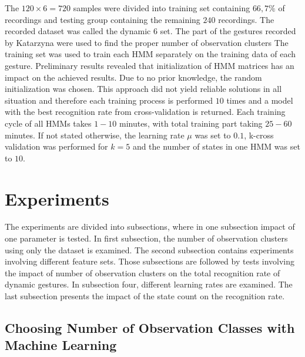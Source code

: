 The $120\times6=720$ samples were divided into training set containing $66,7\%$ of recordings and testing group containing the remaining $240$ recordings. 
The recorded dataset was called the dynamic 6 set.
The part of the gestures recorded by Katarzyna were used to find the proper number of observation clusters
The training set was used to train each HMM separately on the training data of each gesture.
Preliminary results revealed that initialization of HMM matrices has an impact on the achieved results.
Due to no prior knowledge, the random initialization was chosen.
This approach did not yield reliable solutions in all situation and therefore each training process is performed $10$ times and a model with the best recognition rate from cross-validation is returned.  
Each training cycle of all HMMs takes $1-10$ minutes, with total training part taking $25-60$ minutes.
If not stated otherwise, the learning rate $\mu$ was set to $0.1$, k-cross validation was performed for $k=5$ and the number of states in one HMM was set to $10$.


\section{Experiments}
The experiments are divided into subsections, where in one subsection impact of one parameter is tested.
In first subsection, the number of observation clusters using only the dataset is examined.
The second subsection contains experiments involving different feature sets.
Those subsections are followed by tests involving the impact of number of observation clusters on the total recognition rate of dynamic gestures.
In subsection four, different learning rates are examined. The last subsection presents the impact of the state count on the recognition rate. 

\subsection{Choosing Number of Observation Classes with Machine Learning} \label{numberOfClasses1}

